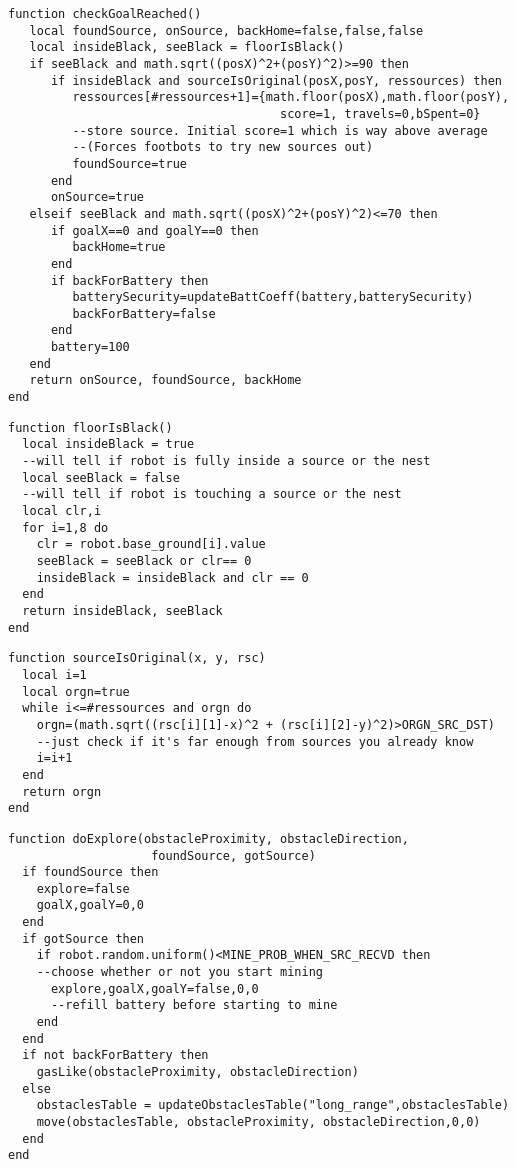 \begin{subappendices}
\begin{lstlisting}[caption=fonction checkGoalReached]
function checkGoalReached()
   local foundSource, onSource, backHome=false,false,false
   local insideBlack, seeBlack = floorIsBlack()
   if seeBlack and math.sqrt((posX)^2+(posY)^2)>=90 then
      if insideBlack and sourceIsOriginal(posX,posY, ressources) then
         ressources[#ressources+1]={math.floor(posX),math.floor(posY),
                                      score=1, travels=0,bSpent=0}
         --store source. Initial score=1 which is way above average
         --(Forces footbots to try new sources out)
         foundSource=true
      end
      onSource=true
   elseif seeBlack and math.sqrt((posX)^2+(posY)^2)<=70 then
      if goalX==0 and goalY==0 then
         backHome=true
      end
      if backForBattery then
         batterySecurity=updateBattCoeff(battery,batterySecurity)
         backForBattery=false
      end
      battery=100
   end
   return onSource, foundSource, backHome
end
\end{lstlisting}

\begin{lstlisting}[caption=Détection de la couleur du sol]
function floorIsBlack()
  local insideBlack = true
  --will tell if robot is fully inside a source or the nest
  local seeBlack = false
  --will tell if robot is touching a source or the nest
  local clr,i
  for i=1,8 do
    clr = robot.base_ground[i].value
    seeBlack = seeBlack or clr== 0
    insideBlack = insideBlack and clr == 0
  end
  return insideBlack, seeBlack
end
\end{lstlisting}

\clearpage
\begin{lstlisting}[caption=Vérifier l'originalité de la source,label=lst:isorgn]
function sourceIsOriginal(x, y, rsc)
  local i=1
  local orgn=true
  while i<=#ressources and orgn do
    orgn=(math.sqrt((rsc[i][1]-x)^2 + (rsc[i][2]-y)^2)>ORGN_SRC_DST)
    --just check if it's far enough from sources you already know
    i=i+1
  end
  return orgn
end
\end{lstlisting}


\begin{lstlisting}[caption=fonction doExplore]
function doExplore(obstacleProximity, obstacleDirection,
                    foundSource, gotSource)
  if foundSource then
    explore=false
    goalX,goalY=0,0
  end
  if gotSource then
    if robot.random.uniform()<MINE_PROB_WHEN_SRC_RECVD then
    --choose whether or not you start mining
      explore,goalX,goalY=false,0,0
      --refill battery before starting to mine
    end
  end
  if not backForBattery then
    gasLike(obstacleProximity, obstacleDirection)
  else
    obstaclesTable = updateObstaclesTable("long_range",obstaclesTable)
    move(obstaclesTable, obstacleProximity, obstacleDirection,0,0)
  end
end
\end{lstlisting}



\end{subappendices}
